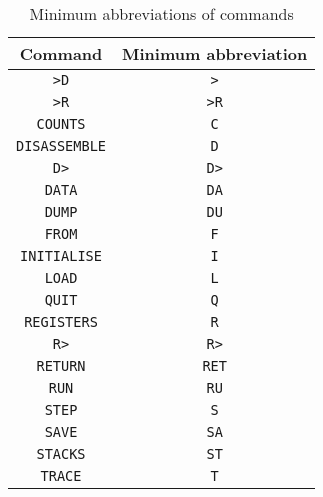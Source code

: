 \begin{table}[h]
\begin{center}
\begin{tabular}{|c|c|} \hline
\rule[-2mm]{0mm}{6mm}\bf Command & \bf Minimum abbreviation \\ \hline
{\tt >D} & {\tt >} \\
{\tt >R} & {\tt >R} \\
{\tt COUNTS} & {\tt C} \\
{\tt DISASSEMBLE} & {\tt D} \\
{\tt D>} & {\tt D>} \\
{\tt DATA} & {\tt DA} \\
{\tt DUMP} & {\tt DU} \\
{\tt FROM} & {\tt F} \\
{\tt INITIALISE} & {\tt I} \\
{\tt LOAD} & {\tt L} \\
{\tt QUIT} & {\tt Q} \\
{\tt REGISTERS} & {\tt R} \\
{\tt R>} & {\tt R>} \\
{\tt RETURN} & {\tt RET} \\
{\tt RUN} & {\tt RU} \\
{\tt STEP} & {\tt S} \\
{\tt SAVE} & {\tt SA} \\
{\tt STACKS} & {\tt ST} \\
{\tt TRACE} & {\tt T} \\ \hline
\end{tabular}
\caption{Minimum abbreviations of commands}
\end{center}
\end{table}
